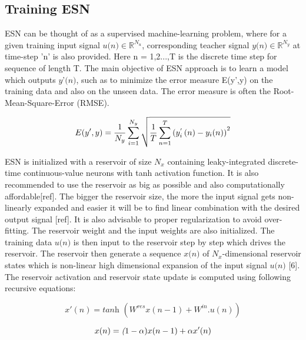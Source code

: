 \subsection{Training ESN}\label{ssec:esn_training}

ESN can be thought of as a supervised machine-learning problem, where for a given training input signal $\textit{u(n)} \in \mathbb{R}^{N_u}$, corresponding teacher signal $\textit{y(n)} \in \mathbb{R}^{N_y}$ at time-step 'n' is also provided. Here n = 1,2...,T is the discrete time step for sequence of length T. The main objective of ESN approach is to learn a model which outputs $\textit{y'(n)}$, such as to minimize the error measure E(y',y) on the training data and also on the unseen data. The error measure is often the Root-Mean-Square-Error (RMSE).

\begin{equation}\label{eqn:rmse}
E(y',y)= \frac{1}{N_{y}}\\
\sum^{N_y}_{i=1}\\
{\sqrt{\frac{1}{T}\\
\sum^{T}_{n=1}\\
{{(y^{'}_i\left(n\right)-y_i(n))}^2}}}\\
\end{equation}

ESN is initialized with a reservoir of size $N_{x}$ containing leaky-integrated discrete-time continuous-value neurons with tanh activation function. It is also recommended to use the reservoir as big as possible and also computationally affordable[ref]. The bigger the reservoir size, the more the input signal gets non-linearly expanded and easier it will be to find linear combination with the desired output signal [ref]. It is also advisable to proper regularization to avoid over- fitting. The reservoir weight and the input weights are also initialized. The training data $\textit{u(n)}$ is then input to the reservoir step by step which drives the reservoir. The reservoir then generate a sequence $\textit{x(n)}$ of $N_{x}$-dimensional reservoir states which is non-linear high dimensional expansion of the input signal $\textit{u(n)}$ [6]. The reservoir activation and reservoir state update is computed using following recursive equations:

\begin{equation} \label{eqn:res_update}
x'(n) =\textit {tanh } ( W^{res}x(n-1)+W^{in}.u(n))
\end{equation}

\begin{equation} \label{eqn:res_state}
x(n) =\textit (1-\alpha)x(n-1)+\alpha x'(n)
\end{equation}

